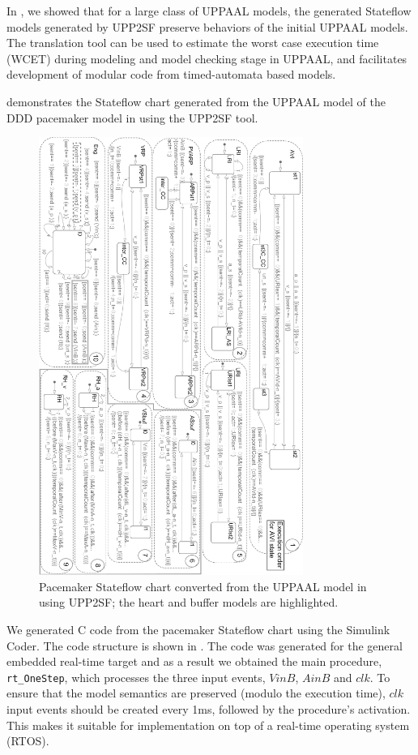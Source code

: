 In \cite{TECS}, we showed that for a large class of UPPAAL models, the generated Stateflow models generated by UPP2SF preserve behaviors of the initial UPPAAL models. The translation tool can be used to estimate the worst case execution time (WCET) during modeling and model checking stage in UPPAAL, and facilitates development of modular code from timed-automata based models. 


 demonstrates the Stateflow chart generated from the UPPAAL model of the DDD pacemaker model in  using the UPP2SF tool.
\begin{figure} [!t]
\center
\includegraphics[width=0.77\textwidth]{figs/PM_SF_buffer_newC1.png} 
\caption{Pacemaker Stateflow chart converted from the UPPAAL model in~ using UPP2SF; the heart and buffer models are highlighted.} 
\label{fig:PM_sf}
\end{figure}
We generated C code from the pacemaker Stateflow chart using the Simulink Coder. The code structure is shown in .
The code was generated for the general embedded real-time target and as a result we obtained the main procedure, \texttt{rt\_OneStep}, which processes the three input events, $VinB$, $AinB$ and $clk$. To ensure that the model semantics are preserved (modulo the execution time), $clk$ input events should be created every 1ms, followed by the procedure's activation. This makes it suitable for implementation on top of a real-time operating system (RTOS).

